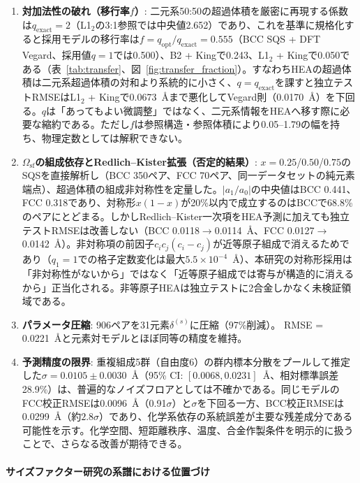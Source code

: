 \documentclass[5p,10pt]{elsarticle}
\begin{document}
\begin{enumerate}
  \item \textbf{対加法性の破れ（移行率$f$）}:
    二元系50:50の超過体積を厳密に再現する係数は$q_\text{exact} = 2$（L1$_2$の3:1参照では中央値2.652）であり、これを基準に規格化すると採用モデルの移行率は$f = q_\text{opt}/q_\text{exact} = 0.555$（BCC SQS + DFT Vegard、採用値$q=1$では0.500）、B2 + Kingで0.243、L1$_2$ + Kingで0.050である（表~\ref{tab:transfer}、図~\ref{fig:transfer_fraction}）。すなわちHEAの超過体積は二元系超過体積の対和より系統的に小さく、$q = q_\text{exact}$を課すと独立テストRMSEはL1$_2$ + Kingで0.0673~\AA{}まで悪化してVegard則（0.0170~\AA{}）を下回る。$q$は「あってもよい微調整」ではなく、二元系情報をHEAへ移す際に必要な縮約である。ただし$f$は参照構造・参照体積により0.05--1.79の幅を持ち、物理定数としては解釈できない。

  \item \textbf{$\Omega_\text{sf}$の組成依存とRedlich--Kister拡張（否定的結果）}:
    $x = 0.25$/$0.50$/$0.75$のSQSを直接解析し（BCC 350ペア、FCC 70ペア、同一データセットの純元素端点）、超過体積の組成非対称性を定量した。$\left|a_1/a_0\right|$の中央値はBCC 0.441、FCC 0.318であり、対称形$x(1-x)$が20\%以内で成立するのはBCCで68.8\%のペアにとどまる。しかしRedlich--Kister一次項をHEA予測に加えても独立テストRMSEは改善しない（BCC 0.0118$\to$0.0114~\AA{}、FCC 0.0127$\to$0.0142~\AA{}）。非対称項の前因子$c_ic_j(c_i-c_j)$が近等原子組成で消えるためであり（$q_1 = 1$での格子定数変化は最大$5.5\times10^{-4}$~\AA{}）、本研究の対称形採用は「非対称性がないから」ではなく「近等原子組成では寄与が構造的に消えるから」正当化される。非等原子HEAは独立テストに2合金しかなく未検証領域である。

  \item \textbf{パラメータ圧縮}:
    906ペアを31元素$\delta^{(s)}$に圧縮（97\%削減）。
    RMSE = 0.0221~\AA{}と元素対モデルとほぼ同等の精度を維持。

  \item \textbf{予測精度の限界}:
    重複組成5群（自由度6）の群内標本分散をプールして推定した$\sigma = 0.0105 \pm 0.0030$~\AA{}（95\% CI: $[0.0068, 0.0231]$~\AA{}、相対標準誤差28.9\%）は、普遍的なノイズフロアとしては不確かである。同じモデルのFCC校正RMSEは0.0096~\AA{}（0.91$\sigma$）と$\sigma$を下回る一方、BCC校正RMSEは0.0299~\AA{}（約$2.8\sigma$）であり、化学系依存の系統誤差が主要な残差成分である可能性を示す。化学空間、短距離秩序、温度、合金作製条件を明示的に扱うことで、さらなる改善が期待できる。
\end{enumerate}

\paragraph{サイズファクター研究の系譜における位置づけ}
\end{document}

